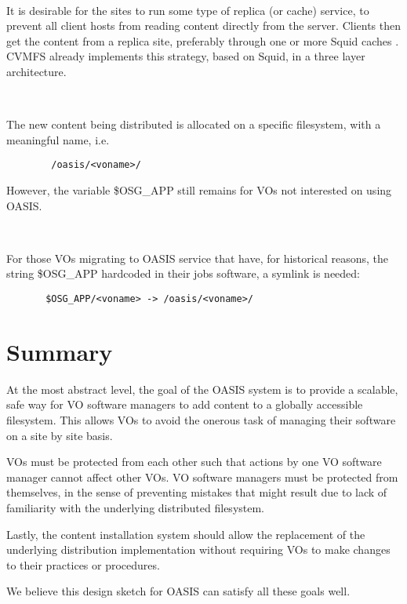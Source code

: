 \documentclass[a4paper]{jpconf}
\begin{document}
~

It is desirable for the sites to run some type of replica (or
cache) service, to prevent all client hosts from reading content directly
from the server. Clients then get the content from a replica site, preferably through one or more Squid caches \cite{squid}.
CVMFS already implements this strategy, based on Squid, in a three layer architecture.

~

The new content being distributed is allocated on a specific filesystem, with a meaningful name, i.e.

\begin{verbatim}
        /oasis/<voname>/ 
\end{verbatim}

However, the  variable \$OSG\_APP still remains for VOs not interested on using OASIS.

~

For those VOs migrating to OASIS service that have, 
for historical reasons, 
the string \$OSG\_APP hardcoded in their jobs software, 
a symlink is needed:

\begin{verbatim}
       $OSG_APP/<voname> -> /oasis/<voname>/ 
\end{verbatim}


\section{Summary}

At the most abstract level, the goal of the OASIS system is to provide a
scalable, safe way for VO software managers to add content to a globally
accessible filesystem. This allows VOs to avoid the onerous task of managing
their software on a site by site basis. 

VOs must be protected from each other such that actions
by one VO software manager cannot affect other VOs. VO software managers
must be protected from themselves, in the sense of preventing mistakes that
might result due to lack of familiarity with the underlying distributed
filesystem. 

Lastly, the content installation system should allow the replacement of the
underlying distribution implementation without requiring VOs to make changes to
their practices or procedures. 

We believe this design sketch for OASIS can satisfy all these goals well. 

\end{document}
